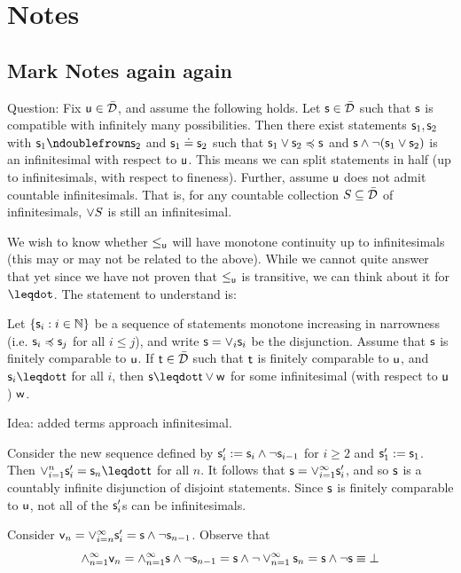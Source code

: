 \documentclass[11pt]{article}
\begin{document}
\section{Notes}

\subsection{Mark Notes again again}

Question: Fix $\stmt[u]\in\tdomain$, and assume the following holds. Let $\stmt\in\tdomain$ such that $\stmt$ is compatible with infinitely many possibilities. Then there exist statements $\stmt_1,\stmt_2$ with $\stmt_1\ncomp\stmt_2$ and $\stmt_1\eqgran\stmt_2$ such that $\stmt_1\OR\stmt_2\narrower\stmt$ and $\stmt\AND\NOT(\stmt_1\OR\stmt_2)$ is an infinitesimal with respect to $\stmt[u]$. This means we can split statements in half (up to infinitesimals, with respect to fineness). 
Further, assume $\stmt[u]$ does not admit countable infinitesimals. That is, for any countable collection $S\subseteq\tdomain$ of infinitesimals, $\OR S$ is still an infinitesimal. 

We wish to know whether $\leq_{\stmt[u]}$ will have monotone continuity up to infinitesimals (this may or may not be related to the above). While we cannot quite answer that yet since we have not proven that $\lequ$ is transitive, we can think about it for $\finer$. The statement to understand is: 

Let $\{\stmt_i:i\in\mathbb{N}\}$ be a sequence of statements monotone increasing in narrowness (i.e. $\stmt_i\narrower\stmt_j$ for all $i\leq j$), and write $\stmt=\OR_i\stmt_i$ be the disjunction. Assume that $\stmt$ is finitely comparable to $\stmt[u]$. If $\stmt[t]\in\tdomain$ such that $\stmt[t]$ is finitely comparable to $\stmt[u]$, and $\stmt_i\finer\stmt[t]$ for all $i$, then $\stmt\finer\stmt[t]\OR\stmt[w]$ for some infinitesimal (with respect to $\stmt[u]$) $\stmt[w]$. 

Idea: added terms approach infinitesimal. 

Consider the new sequence defined by $\stmt'_i := \stmt_i \AND \NOT\stmt_{i-1}$ for $i\geq2$ and $\stmt'_1 := \stmt_1$. Then $\OR_{i=1}^n\stmt'_i = \stmt_n\finer\stmt[t]$ for all $n$. It follows that $\stmt = \OR_{i=1}^{\infty}\stmt'_i$, and so $\stmt$ is a countably infinite disjunction of disjoint statements. Since $\stmt$ is finitely comparable to $\stmt[u]$, not all of the $\stmt_i'$s can be infinitesimals. 

Consider $\stmt[v]_n = \OR_{i=n}^{\infty}\stmt'_i = \stmt \AND\NOT\stmt_{n-1}$. Observe that $$\AND_{n=1}^{\infty}\stmt[v]_n = \AND_{n=1}^{\infty}\stmt\AND\NOT\stmt_{n-1} = \stmt\AND\NOT\OR_{n=1}^{\infty}\stmt_n = \stmt\AND\NOT\stmt \equiv \impossibility$$
\end{document}
